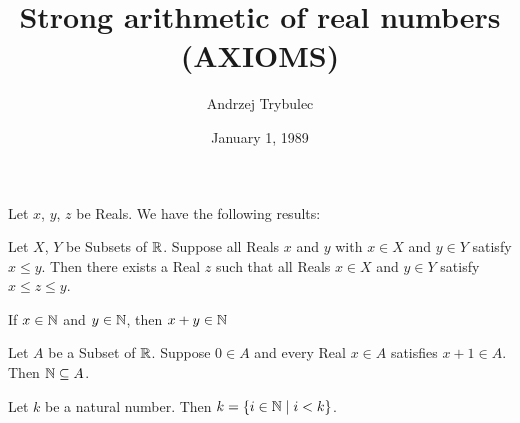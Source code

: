 \documentclass{article}
\title{Strong arithmetic of real numbers (AXIOMS)}
\author{Andrzej Trybulec}
\date{January 1, 1989}
\begin{document}
\maketitle

Let $x$, $y$, $z$ be Reals. We have the following results:
\begin{thm}
\item Let $X$, $Y$ be Subsets of $\mathbb{R}$.
  Suppose all Reals $x$ and $y$ with $x\in X$ and $y\in Y$ satisfy
  $x\leq y$.
  Then there exists a Real $z$ such that all Reals $x\in X$ and $y\in Y$
  satisfy $x\leq z\leq y$.
\item If $x\in\mathbb{N}$ and $y\in\mathbb{N}$, then $x+y\in\mathbb{N}$
\item Let $A$ be a Subset of $\mathbb{R}$.
  Suppose $0\in A$ and every Real $x\in A$ satisfies $x+1\in A$.
  Then $\mathbb{N}\subseteq A$.
\item Let $k$ be a natural number.
  Then $k=\{i\in\mathbb{N}\mid i<k\}$.
\end{thm}
\end{document}
